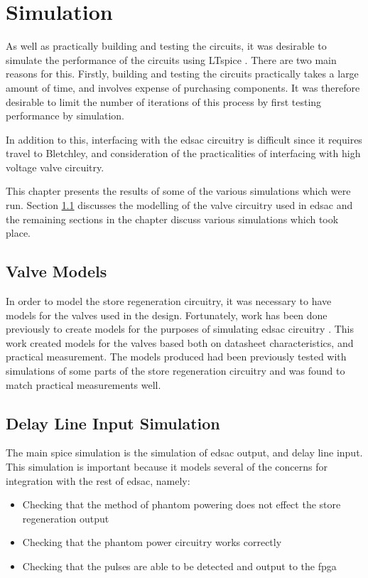 \section{ Simulation}
As well as practically building and testing the circuits, it was desirable to simulate the performance of the circuits using LTspice \cite{linear2017}. There are two main reasons for this. Firstly, building and testing the circuits practically takes a large amount of time, and involves expense of purchasing components. It was therefore desirable to limit the number of iterations of this process by first testing performance by simulation.

In addition to this, interfacing with the \gls{edsac} circuitry is difficult since it requires travel to Bletchley, and consideration of the practicalities of interfacing with high voltage valve circuitry.

This chapter presents the results of some of the various simulations which were run. Section \ref{sec:spice-valve-models} discusses the modelling of the valve circuitry used in \gls{edsac} and the remaining sections in the chapter discuss various simulations which took place.

\subsection{Valve Models} \label{sec:spice-valve-models}

In order to model the store regeneration circuitry, it was necessary to have models for the valves used in the design. Fortunately, work has been done previously to create models for the purposes of simulating \gls{edsac} circuitry \cite{linnington2015}. This work created models for the valves based both on datasheet characteristics, and practical measurement. The models produced had been previously tested with simulations of some parts of the store regeneration circuitry and was found to match practical measurements well.

\subsection{Delay Line Input Simulation}
The main \gls{spice} simulation is the simulation of \gls{edsac} output, and delay line input. This simulation is important because it models several of the concerns for integration with the rest of \gls{edsac}, namely:
\begin{itemize}
	\item Checking that the method of phantom powering does not effect the store regeneration output
	\item Checking that the phantom power circuitry works correctly
	\item Checking that the pulses are able to be detected and output to the \gls{fpga}
\end{itemize}

